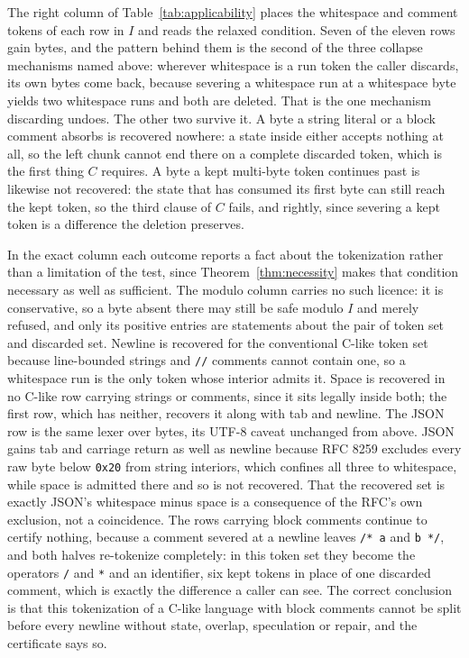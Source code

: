 \documentclass[11pt,a4paper]{article}
\theoremstyle{definition}
\theoremstyle{plain}
\newcommand{\code}[1]{\texttt{#1}}
\begin{document}
The right column of Table~\ref{tab:applicability} places the whitespace and comment tokens of each row in $I$ and
reads the relaxed condition. Seven of the eleven rows gain bytes, and the pattern behind them is the second of the
three collapse mechanisms named above: wherever whitespace is a run token the caller discards, its own bytes come
back, because severing a whitespace run at a whitespace byte yields two whitespace runs and both are deleted. That is
the one mechanism discarding undoes. The other two survive it. A byte a string literal or a block comment absorbs is
recovered nowhere: a state inside either accepts nothing at all, so the left chunk cannot end there on a complete
discarded token, which is the first thing $C$ requires. A byte a kept multi-byte token continues past is likewise not
recovered: the state that has consumed its first byte can still reach the kept token, so the third clause of $C$
fails, and rightly, since severing a kept token is a difference the deletion preserves.

In the exact column each outcome reports a fact about the tokenization rather than a limitation of the test, since
Theorem~\ref{thm:necessity} makes that condition necessary as well as sufficient. The modulo column carries no such
licence: it is conservative, so a byte absent there may still be safe modulo $I$ and merely refused, and only its
positive entries are statements about the pair of token set and discarded set. Newline is recovered for the
conventional C-like token set because line-bounded strings and \code{//} comments cannot contain one, so a whitespace
run is the only token whose interior admits it. Space is recovered in no C-like row carrying strings or comments,
since it sits legally inside both; the first row, which has neither, recovers it along with tab and newline. The JSON
row is the same lexer over bytes, its UTF-8 caveat unchanged from above. JSON gains tab and carriage return as well as
newline because RFC 8259 excludes every raw byte below \code{0x20} from string interiors, which confines all three to
whitespace, while space is admitted there and so is not recovered. That the recovered set is exactly JSON's whitespace
minus space is a consequence of the RFC's own exclusion, not a coincidence. The rows carrying block comments continue
to certify nothing, because a comment severed at a newline leaves \code{/*\,a} and \code{b\,*/}, and both halves
re-tokenize completely: in this token set they become the operators \code{/} and \code{*} and an identifier, six kept
tokens in place of one discarded comment, which is exactly the difference a caller can see. The correct conclusion is
that this tokenization of a C-like language with block comments cannot be split before every newline without state,
overlap, speculation or repair, and the certificate says so.
\end{document}
